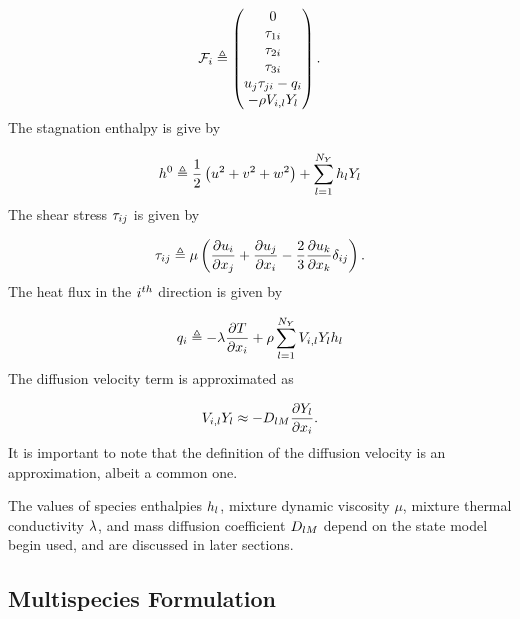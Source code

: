 \begin{equation}
	\mathcal{F}_{i} \triangleq \begin{pmatrix}
		0 \\
		\tau_{1 i} \\
		\tau_{2 i} \\
		\tau_{3 i} \\
		u_{j} \tau_{j i} - q_{i} \\ 
		- \rho V_{i, l} Y_{l}
	\end{pmatrix}.
\end{equation}
The stagnation enthalpy is give by

\begin{equation}
	h^0 \triangleq \frac{1}{2}\left( u^2 + v^2 + w^2 \right) + \sum_{l = 1}^{N_Y} h_{l} Y_{l}
\end{equation}
The shear stress $\tau_{i j}$ is given by

\begin{equation}
	\tau_{i j} \triangleq \mu \left( \frac{\partial u_{i}}{\partial x_{j}} + \frac{\partial u_{j}}{\partial x_{i}} - \frac{2}{3} \frac{\partial u_{k}}{\partial x_{k}} \delta_{i j} \right).
\end{equation}
The heat flux in the $i^{th}$ direction is given by

\begin{equation}
	q_{i} \triangleq - \lambda \frac{\partial T}{\partial x_{i}} + \rho \sum_{l = 1}^{N_Y} V_{i, l} Y_{l} h_{l}
\end{equation}
The diffusion velocity term is approximated as

\begin{equation}
	V_{i, l} Y_{l} \approx - D_{l M} \frac{\partial Y_{l}}{\partial x_{i}}.
\end{equation}
It is important to note that the definition of the diffusion velocity is an approximation, albeit a common one.

The values of species enthalpies $h_{l}$, mixture dynamic viscosity $\mu$, mixture thermal conductivity $\lambda$, and mass diffusion coefficient $D_{l M}$ depend on the state model begin used, and are discussed in later sections.

\subsection{Multispecies Formulation}

